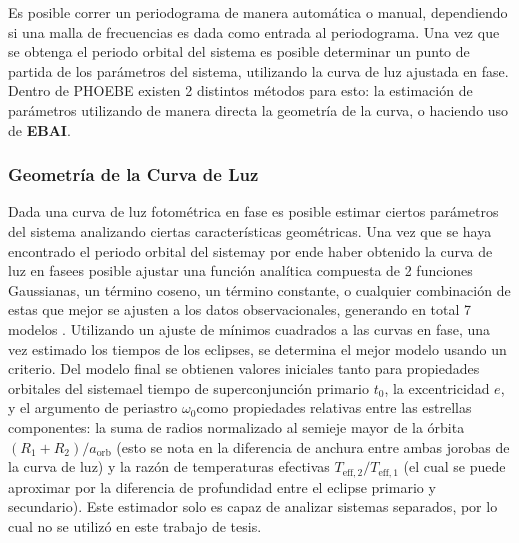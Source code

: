 Es posible correr un periodograma de manera automática o manual, dependiendo si
una malla de frecuencias es dada como entrada al periodograma. Una vez que se
obtenga el periodo orbital del sistema es posible determinar un punto de partida
de los parámetros del sistema, utilizando la curva de luz ajustada en fase.
Dentro de PHOEBE existen 2 distintos métodos para esto: la estimación de
parámetros utilizando de manera directa la geometría de la curva, o haciendo uso
de \textbf{EBAI}.

\subsubsection{Geometría de la Curva de Luz}
Dada una curva de luz fotométrica en fase es posible estimar ciertos parámetros
del sistema analizando ciertas características geométricas. Una vez que
se haya encontrado el periodo orbital del sistema\textemdash y por ende haber
obtenido la curva de luz en fase\textemdash es posible ajustar una función
analítica compuesta de 2 funciones Gaussianas, un término coseno, un término
constante, o cualquier combinación de estas que mejor se ajusten a los datos
observacionales, generando en total 7 modelos
. Utilizando un
ajuste de mínimos cuadrados a las curvas en fase, una vez estimado los tiempos
de los eclipses, se determina el mejor modelo usando un criterio. Del modelo
final se obtienen valores iniciales tanto para propiedades orbitales del
sistema\textemdash el tiempo de superconjunción primario $t_0$, la excentricidad
$e$, y el argumento de periastro $\omega_0$\textemdash como propiedades
relativas entre las estrellas componentes: la suma de radios normalizado al
semieje mayor de la órbita $(R_1 + R_2)/a_{\mathrm{orb}}$ (esto se nota en la
diferencia de anchura entre ambas jorobas de la curva de luz) y la razón de
temperaturas efectivas $T_{\mathrm{eff},2}/T_{\mathrm{eff},1}$ (el cual se puede
aproximar por la diferencia de profundidad entre el eclipse primario y
secundario). Este estimador solo es capaz de analizar sistemas separados, por lo
cual no se utilizó en este trabajo de tesis.

